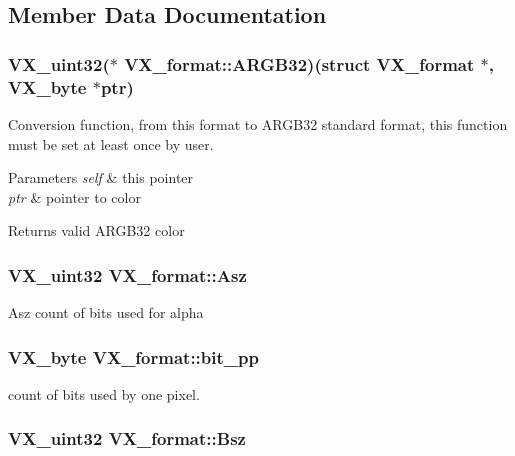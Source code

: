 \subsection{Member Data Documentation}
\hypertarget{structVX__format_ad6bed9f8736501502c0e00548bdb08b8}{
\subsubsection[{A\-R\-G\-B32}]{\setlength{\rightskip}{0pt plus 5cm}V\-X\-\_\-uint32($\ast$ V\-X\-\_\-format\-::\-A\-R\-G\-B32)(struct {\bf V\-X\-\_\-format} $\ast$, V\-X\-\_\-byte $\ast$ptr)}}\label{structVX__format_ad6bed9f8736501502c0e00548bdb08b8}
Conversion function, from this format to A\-R\-G\-B32 standard format, this function must be set at least once by user. 
\begin{DoxyParams}{Parameters}
{\em self} & this pointer \\
\hline
{\em ptr} & pointer to color \\
\hline
\end{DoxyParams}
\begin{DoxyReturn}{Returns}
valid A\-R\-G\-B32 color 
\end{DoxyReturn}
\hypertarget{structVX__format_a51927e3b58188b62c7ab5538ab9a9653}{
\subsubsection[{Asz}]{\setlength{\rightskip}{0pt plus 5cm}V\-X\-\_\-uint32 V\-X\-\_\-format\-::\-Asz}}\label{structVX__format_a51927e3b58188b62c7ab5538ab9a9653}
Asz count of bits used for alpha \hypertarget{structVX__format_ac3c60bc6d9b514af42bcdd317f95aa7f}{
\subsubsection[{bit\-\_\-pp}]{\setlength{\rightskip}{0pt plus 5cm}V\-X\-\_\-byte V\-X\-\_\-format\-::bit\-\_\-pp}}\label{structVX__format_ac3c60bc6d9b514af42bcdd317f95aa7f}
count of bits used by one pixel. \hypertarget{structVX__format_a0c77f4eb51f10ef17e4826d9bb1fedcb}{
\subsubsection[{Bsz}]{\setlength{\rightskip}{0pt plus 5cm}V\-X\-\_\-uint32 V\-X\-\_\-format\-::\-Bsz}}\label{structVX__format_a0c77f4eb51f10ef17e4826d9bb1fedcb}
